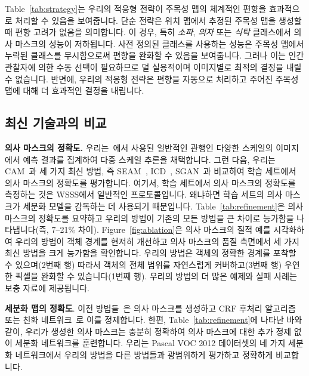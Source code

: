 \documentclass[final]{cvpr}
\begin{document}



Table~\ref{tab:strategy}는 우리의 적응형 전략이 주목성 맵의 체계적인 편향을 효과적으로 처리할 수 있음을 보여줍니다. 단순 전략은 위치 맵에서 추정된 주목성 맵을 생성할 때 편향 고려가 없음을 의미합니다. 이 경우, 특히 \emph{소파}, \emph{의자} 또는 \emph{식탁} 클래스에서 의사 마스크의 성능이 저하됩니다. 사전 정의된 클래스를 사용하는 성능은 주목성 맵에서 누락된 클래스를 무시함으로써 편향을 완화할 수 있음을 보여줍니다. 그러나 이는 인간 관찰자에 의한 수동 선택이 필요하므로 덜 실용적이며 이미지별로 최적의 결정을 내릴 수 없습니다. 반면에, 우리의 적응형 전략은 편향을 자동으로 처리하고 주어진 주목성 맵에 대해 더 효과적인 결정을 내립니다.

\subsection{최신 기술과의 비교}
\label{section5.3}

\noindent \textbf{의사 마스크의 정확도.} 우리는~\cite{ahn2018learning,wang2020self}에서 사용된 일반적인 관행인 다양한 스케일의 이미지에서 예측 결과를 집계하여 다중 스케일 추론을 채택합니다. 그런 다음, 우리는 CAM~\cite{zhou2016learning}과 세 가지 최신 방법, 즉 SEAM~\cite{wang2020self}, ICD~\cite{fan2020learning}, SGAN~\cite{yao2020saliency}과 비교하여 학습 세트에서 의사 마스크의 정확도를 평가합니다. 여기서, 학습 세트에서 의사 마스크의 정확도를 측정하는 것은 WSSS에서 일반적인 프로토콜입니다. 왜냐하면 학습 세트의 의사 마스크가 세분화 모델을 감독하는 데 사용되기 때문입니다. Table~\ref{tab:refinement}은 의사 마스크의 정확도를 요약하고 우리의 방법이 기존의 모든 방법을 큰 차이로 능가함을 나타냅니다(즉, 7--21\% 차이). Figure~\ref{fig:ablation}은 의사 마스크의 질적 예를 시각화하여 우리의 방법이 객체 경계를 현저히 개선하고 의사 마스크의 품질 측면에서 세 가지 최신 방법을 크게 능가함을 확인합니다. 우리의 방법은 객체의 정확한 경계를 포착할 수 있으며(2번째 행) 따라서 객체의 전체 범위를 자연스럽게 커버하고(3번째 행) 우연한 픽셀을 완화할 수 있습니다(1번째 행). 우리의 방법의 더 많은 예제와 실패 사례는 보충 자료에 제공됩니다.





\vspace{1mm}
\noindent \textbf{세분화 맵의 정확도}. 이전 방법들~\cite{ahn2018learning, fan2020learning, wang2020self}은 의사 마스크를 생성하고 CRF 후처리 알고리즘~\cite{krahenbuhl2011efficient} 또는 친화 네트워크~\cite{ahn2018learning}로 이를 정제합니다. 한편, Table~\ref{tab:refinement}에 나타난 바와 같이, 우리가 생성한 의사 마스크는 충분히 정확하여 의사 마스크에 대한 추가 정제 없이 세분화 네트워크를 훈련합니다. 우리는 Pascal VOC 2012 데이터셋의 네 가지 세분화 네트워크에서 우리의 방법을 다른 방법들과 광범위하게 평가하고 정확하게 비교합니다.
\end{document}
